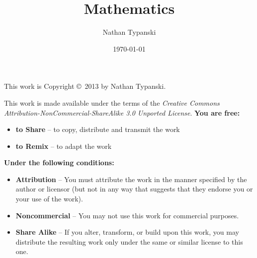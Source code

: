 \documentclass[letterpaper]{book}
\begin{document}

\title     {\textbf{
  Mathematics
}}
\author    {Nathan Typanski}
\date      {\today}
\maketitle
\newpage

\begin{center}
This work is Copyright \copyright\ 2013 by Nathan Typanski.
\end{center}

This work is made available under the terms of the \emph{Creative Commons Attribution-NonCommercial-ShareAlike 3.0 Unported License}.
\textbf{You are free:}
\begin{itemize}
  \item[] \textbf{to Share} -- to copy, distribute and transmit the work
  \item[] \textbf{to Remix} -- to adapt the work
\end{itemize}

\textbf{Under the following conditions:}
\begin{itemize}
  \item[]\ccby\textbf{Attribution} -- You must attribute the work in the manner specified by the author or licensor (but not in any way that suggests that they endorse you or your use of the work).
  \item[] \ccnc\textbf{Noncommercial} -- You may not use this work for commercial purposes.
  \item[] \ccsa\textbf{Share Alike} -- If you alter, transform, or build upon this work, you may distribute the resulting work only under the same or similar license to this one.
\end{itemize}
\end{document}

